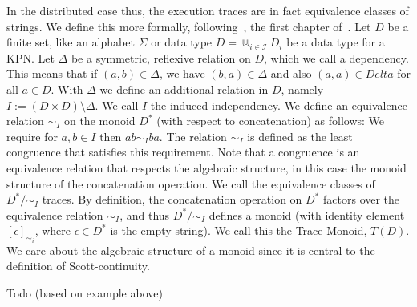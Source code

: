 In the distributed case thus, the execution traces are in fact equivalence classes of strings.
We define this more formally, following~\cite{mazurkiewicz1995introduction}, the first chapter of~\cite{diekert1995book}.
Let $D$ be a finite set, like an alphabet $\Sigma$ or data type $D = \Cup_{i \in \mathcal{I}} D_i$ be a data type for a \ac{KPN}.
Let $\Delta$ be a symmetric, reflexive relation on $D$, which we call a dependency.
This means that if $(a,b) \in \Delta$, we have $(b,a) \in \Delta$ and also $(a,a) \in Delta$ for all $a \in D$. 
With $\Delta$ we define an additional relation in $D$, namely $I := (D \times D) \setminus \Delta$.
We call $I$ the induced independency. 
We define an equivalence relation $\sim_I$ on the monoid $D^*$ (with respect to concatenation) as follows:
We require for $a,b \in I$ then $ab \sim_I ba$. The relation $\sim_I$ is defined as the least congruence that satisfies this requirement.
Note that a congruence is an equivalence relation that respects the algebraic structure, in this case the monoid structure of the concatenation operation.
We call the equivalence classes of $D^*/{\sim_I}$ traces. 
By definition, the concatenation operation on $D^*$ factors over the equivalence relation $\sim_I$,
and thus $D^*/{\sim_I}$ defines a monoid (with identity element $[\epsilon]_{\sim_i}$, where $\epsilon \in D^*$ is the empty string).
We call this the Trace Monoid, $T(D)$.
We care about the algebraic structure of a monoid since it is central to the definition of Scott-continuity.

\begin{ex}
  Todo (based on example above)
\end{ex}

